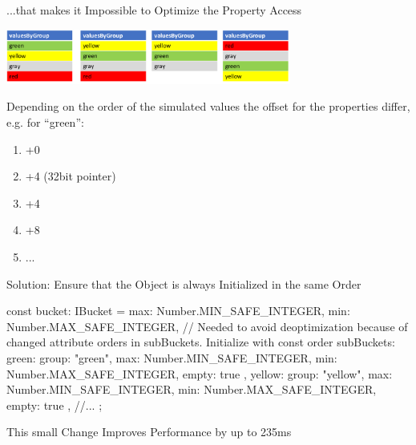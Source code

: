 \begin{frame}{...that makes it Impossible to Optimize the Property Access}
	\begin{center}
		\includegraphics[width=0.7\textwidth]{memory-model}
	\end{center}
	
	Depending on the order of the simulated values the offset for the properties differ, e.g. for \enquote{green}:
	
	\begin{enumerate}[<+->]
		\item +0
		\item +4 (32bit pointer)
		\item +4
		\item +8
		\item ...
	\end{enumerate}
	
\end{frame}

\begin{frame}{Solution: Ensure that the Object is always Initialized in the same Order}
	\begin{javascriptcode}
const bucket: IBucket = {
	max: Number.MIN_SAFE_INTEGER,
	min: Number.MAX_SAFE_INTEGER,
	// Needed to avoid deoptimization because of changed attribute orders in subBuckets. Initialize with const order
	subBuckets: {
		green: {
			group: "green",
			max: Number.MIN_SAFE_INTEGER,
			min: Number.MAX_SAFE_INTEGER,
			empty: true
		},
		yellow: {
			group: "yellow",
			max: Number.MIN_SAFE_INTEGER,
			min: Number.MAX_SAFE_INTEGER,
			empty: true
		},
		//...
	}
};	
	\end{javascriptcode}
\end{frame}

\begin{frame}{This small Change Improves Performance by up to 235ms}
\end{frame}

